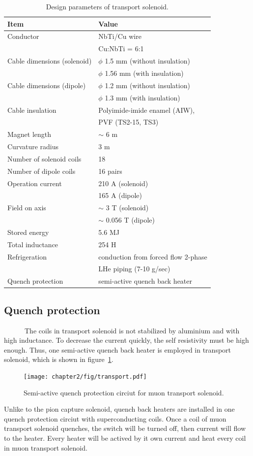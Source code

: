 \begin{table}[H]
 \centering
 \begin{tabular}{ll} \hline \hline
  Item & Value \\ \hline
  Conductor & NbTi/Cu wire \\
   & Cu:NbTi = 6:1 \\
  Cable dimensions (solenoid) & $\phi$ 1.5 mm (without insulation) \\
   & $\phi$ 1.56 mm (with insulation) \\
  Cable dimensions (dipole) & $\phi$ 1.2 mm (without insulation) \\
   & $\phi$ 1.3 mm (with insulation) \\
  Cable insulation & Polyimide-imide enamel (AIW), \\
   & PVF (TS2-15, TS3) \\
  Magnet length & $\sim$ 6 m \\
  Curvature radius & 3 m \\
  Number of solenoid coils & 18 \\
  Number of dipole coils & 16 pairs \\
  Operation current & 210 A (solenoid) \\
   & 165 A (dipole) \\
  Field on axis & $\sim$ 3 T (solenoid) \\
   & $\sim$ 0.056 T (dipole) \\
  Stored energy & 5.6 MJ \\
  Total inductance & 254 H \\
  Refrigeration & conduction from forced flow 2-phase \\
   & LHe piping (7-10 g/sec) \\
  Quench protection & semi-active quench back heater \\ \hline \hline
 \end{tabular}
 \caption{Design parameters of transport solenoid.}
 \label{designts}
\end{table}

\subsection{Quench protection}
~~~~~~The coils in transport solenoid is not stabilized by aluminium and with high inductance.
To decrease the current quickly, the self resistivity must be high enough.
Thus, one semi-active quench back heater is employed in transport solenoid, which is shown in figure~\ref{transqu}.
\begin{figure}[H]
 \centering
 \texttt{[image: chapter2/fig/transport.pdf]}
 \caption{Semi-active quench protection circiut for muon transport solenoid.}
 \label{transqu}
\end{figure}
Unlike to the pion capture solenoid, quench back heaters are installed in one quench protection circiut with superconducting coils.
Once a coil of muon transport solenoid quenches, the switch will be turned off, then current will flow to the heater.
Every heater will be actived by it own current and heat every coil in muon transport solenoid.

